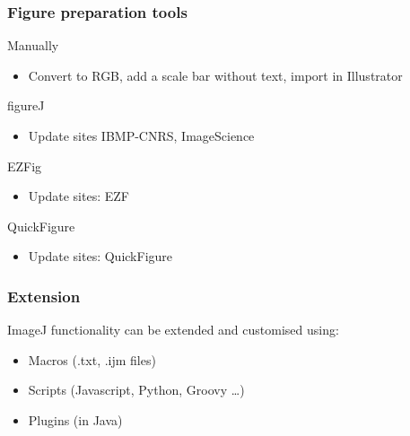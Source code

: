 \documentclass[ignorenonframetext,aspectratio=169,10pt,xcolor=table]{beamer}
\begin{document}
\begin{frame} \frametitle{Figure preparation tools}
  \begin{block}{Manually}
    \begin{itemize}
    \item Convert to RGB, add a scale bar without text, import in
      Illustrator
    \end{itemize}
  \end{block}
  \begin{block}{figureJ}
    \begin{itemize}
    \item Update sites IBMP-CNRS, ImageScience
    \end{itemize}
  \end{block}

  \begin{block}{EZFig}
    \begin{itemize}
    \item Update sites: EZF
    \end{itemize}
  \end{block}


  \begin{block}{QuickFigure}
    \begin{itemize}
    \item Update sites: QuickFigure
    \end{itemize}
  \end{block} 
\end{frame}

\begin{frame} \frametitle{Extension}

  ImageJ functionality can be extended and customised using:
  \begin{itemize}
  \item Macros (.txt, .ijm files)
  \item Scripts (Javascript, Python, Groovy \dots)
  \item Plugins (in Java)
  \end{itemize}
\end{frame}
\end{document}
